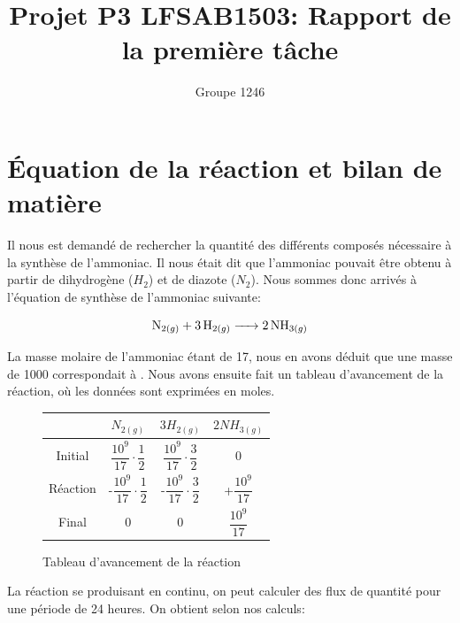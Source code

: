 \documentclass[11pt,a4paper]{report}
\author{Groupe 1246}
\title{Projet P3 LFSAB1503: Rapport de la première tâche}
\begin{document}
\maketitle

\section*{Équation de la réaction et bilan de matière}

Il nous est demandé de rechercher la quantité des différents composés nécessaire à la synthèse de l'ammoniac.
Il nous était dit que l'ammoniac pouvait être obtenu à partir de dihydrogène ($H_2$) et de diazote ($N_2$).
Nous sommes donc arrivés à l'équation de synthèse de l'ammoniac suivante: 


 $$\ce{N_{2(g)} + 3H_{2(g)} -> 2NH_{3(g)}}$$

La masse molaire de l'ammoniac étant de \unit{17}{\gram\per\mole}, nous en avons déduit que une masse de \unit{1000}{\ton}
correspondait à \unit{}{\mole}. Nous avons ensuite fait un tableau d'avancement de la réaction,
où les données sont exprimées en moles.

\begin{figure}[h]
\centering
\begin{tabular}{|c|c|c|c|}
\hline 
 & $N_{2(g)}$ & $3H_{2(g)} $ & $2NH_{3(g)}$ \\ 
\hline 
Initial & $\dfrac{10^{9}}{17} \cdot \dfrac{1}{2}$ & $\dfrac{10^{9}}{17} \cdot \dfrac{3}{2}$ & 0 \\ 
\hline 
Réaction & -$\dfrac{10^{9}}{17} \cdot \dfrac{1}{2}$ & -$\dfrac{10^{9}}{17} \cdot \dfrac{3}{2}$ & +$\dfrac{10^{9}}{17}$ \\ 
\hline 
Final & 0 & 0 & $\dfrac{10^{9}}{17}$ \\ 
\hline 
\end{tabular} 
\caption{Tableau d'avancement de la réaction}
\label{tableau}
\end{figure}

La réaction se produisant en continu, on peut calculer des flux de quantité pour une période de 24 heures.
On obtient selon nos calculs:

\begin{itemize}
  \item{une consommation de $N_2$ égale à: $\dfrac{10^{9}}{17} \cdot \dfrac{1}{2} \cdot \dfrac{1}{3600 \cdot 24} \cong 340.41 $ \unit{}{\mole\per\second}.}
  \item{une consommation de $H_2$ égale à: $\dfrac{10^{9}}{17} \cdot \dfrac{3}{2} \cdot \dfrac{1}{3600 \cdot 24} \cong 1021.241 $\unit{}{\mole\per\second}
  \item{une production de $NH_3$ égale à: $\dfrac{10^{9}}{17}} \cdot \dfrac{1}{3600 \cdot 24} \cong 680.827$ \unit{}{\mole\per\second}
}}\end{itemize}
\end{document}
